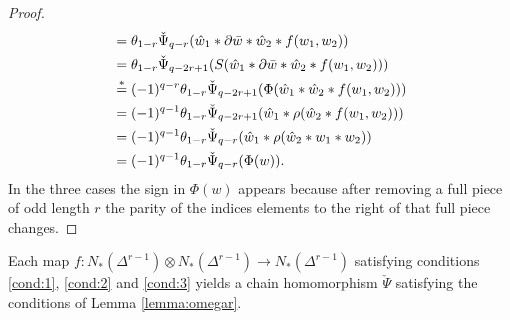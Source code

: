 \begin{proof}
\begin{align*}
		&= \theta_{1-r}\check{\Psi}_{q-r}(\hat{w}_1*\partial\bar{w}*\hat{w}_2*f(w_1,w_2)) \\
		&= \theta_{1-r}\check{\Psi}_{q-2r+1}(S(\hat{w}_1*\partial\bar{w}*\hat{w}_2*f(w_1,w_2)))\\
	    &\overset{*}{=} (-1)^{q-r} \theta_{1-r}\check{\Psi}_{q-2r+1}(\Phi(\hat{w}_1*\hat{w}_2*f(w_1,w_2))) \\
		&= (-1)^{q-1} \theta_{1-r}\check{\Psi}_{q-2r+1}(\hat{w}_1*\rho(\hat{w}_2*f(w_1,w_2)))\\
		&= (-1)^{q-1} \theta_{1-r}\check{\Psi}_{q-r}(\hat{w}_1*\rho(\hat{w}_2*w_1*w_2))\\
		&= (-1)^{q-1}\theta_{1-r}\check{\Psi}_{q-r}(\Phi(w)). \qedhere
	\end{align*}
In the three cases the sign in $\Phi(w)$ appears because after removing a full piece of odd length $r$ the parity of the indices elements to the right of that full piece changes.
\end{proof}

\begin{corollary} Each map $f\colon N_*(\Delta^{r-1})\otimes N_*(\Delta^{r-1})\to N_*(\Delta^{r-1})$ satisfying conditions \eqref{cond:1}, \eqref{cond:2} and \eqref{cond:3} yields a chain homomorphism $\check{\Psi}$ satisfying the conditions of Lemma \ref{lemma:omegar}.
\end{corollary}

